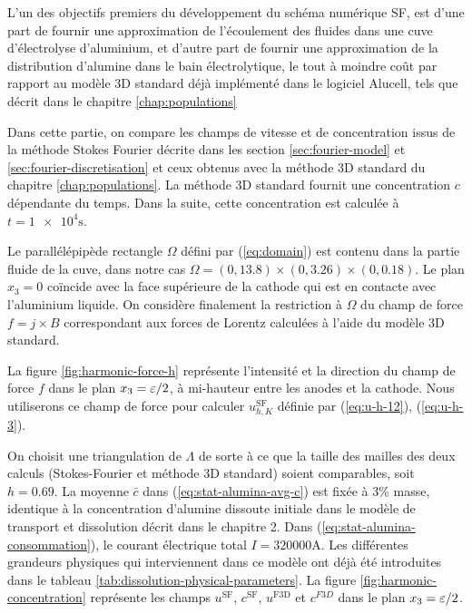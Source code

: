 L'un des objectifs premiers du développement du schéma numérique
SF, est d'une part de fournir une approximation de l'écoulement des
fluides dans une cuve d'électrolyse d'aluminium, et d'autre part
de fournir une approximation de la distribution d'alumine dans le bain
électrolytique, le tout à moindre coût par rapport au modèle
3D standard déjà implémenté dans le logiciel Alucell, tels que décrit
dans le chapitre \ref{chap:populations}

Dans cette partie, on compare les champs de vitesse et de
concentration issus de la méthode Stokes Fourier décrite dans les
section \ref{sec:fourier-model} et \ref{sec:fourier-discretisation} et
ceux obtenus avec la méthode 3D standard du chapitre
\ref{chap:populations}. La méthode 3D standard fournit une
concentration $c$ dépendante du temps. Dans la suite, cette
concentration est calculée à $t = \num{1e4}\si{\second}$.

Le parallélépipède rectangle $\Omega$ défini par (\ref{eq:domain}) est
contenu dans la partie fluide de la cuve, dans notre cas $\Omega = (0,
\num{13.8})\times(0,\num{3.26})\times(0,\num{0.18})$. Le plan $x_3 =
0$ coïncide avec la face supérieure de la cathode qui est en contacte
avec l'aluminium liquide. On considère finalement la restriction à
$\Omega$ du champ de force $f = j\times B$ correspondant aux forces de
Lorentz calculées à l'aide du modèle 3D standard.

La figure \ref{fig:harmonic-force-h} représente l'intensité et la
direction du champ de force $f$ dans le plan $x_3 = \varepsilon / 2$,
à mi-hauteur entre les anodes et la cathode. Nous utiliserons ce champ
de force pour calculer $u_{h,K}^\mathrm{SF}$ définie par
(\ref{eq:u-h-12}), (\ref{eq:u-h-3}).

On choisit une triangulation de $\Lambda$ de sorte à ce que la taille
des mailles des deux calculs (Stokes-Fourier et méthode 3D standard)
soient comparables, soit $h = \num{0.69}$. La moyenne $\bar{c}$ dans
(\ref{eq:stat-alumina-avg-c}) est fixée à 3\% masse, identique à la
concentration d'alumine dissoute initiale dans le modèle de transport
et dissolution décrit dans le chapitre 2. Dans
(\ref{eq:stat-alumina-consommation}), le courant électrique total $I =
\num{320000} \si{\ampere}$. Les différentes grandeurs physiques qui
interviennent dans ce modèle ont déjà été introduites dans le tableau
\ref{tab:dissolution-physical-parameters}. La figure
\ref{fig:harmonic-concentration} représente les champs
$u^{\mathrm{SF}}$, $c^\mathrm{SF}$, $u^\mathrm{F3D}$ et $c^{F3D}$ dans
le plan $x_3 = \varepsilon / 2$.


